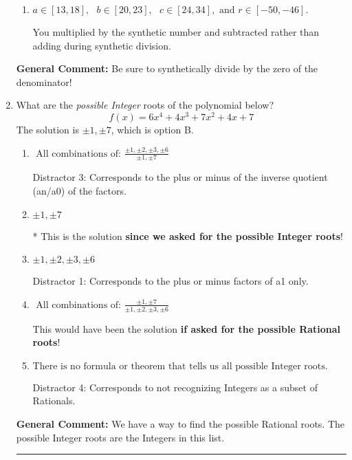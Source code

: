 \documentclass{extbook}[14pt]
\newcommand{\litem}[1]{\item #1

\rule{\textwidth}{0.4pt}}
\begin{document}
\begin{enumerate}
{\begin{enumerate}[label=\Alph*.]
 You divided by the opposite of the factor.
\item \( a \in [13, 18], \text{   } b \in [20, 23], \text{   } c \in [24, 34], \text{   and   } r \in [-50, -46]. \)

 You multiplied by the synthetic number and subtracted rather than adding during synthetic division.
\end{enumerate}

\textbf{General Comment:} Be sure to synthetically divide by the zero of the denominator!
}
\litem{
What are the \textit{possible Integer} roots of the polynomial below?
\[ f(x) = 6x^{4} +4 x^{3} +7 x^{2} +4 x + 7 \]The solution is \( \pm 1,\pm 7 \), which is option B.\begin{enumerate}[label=\Alph*.]
\item \( \text{ All combinations of: }\frac{\pm 1,\pm 2,\pm 3,\pm 6}{\pm 1,\pm 7} \)

 Distractor 3: Corresponds to the plus or minus of the inverse quotient (an/a0) of the factors. 
\item \( \pm 1,\pm 7 \)

* This is the solution \textbf{since we asked for the possible Integer roots}!
\item \( \pm 1,\pm 2,\pm 3,\pm 6 \)

 Distractor 1: Corresponds to the plus or minus factors of a1 only.
\item \( \text{ All combinations of: }\frac{\pm 1,\pm 7}{\pm 1,\pm 2,\pm 3,\pm 6} \)

This would have been the solution \textbf{if asked for the possible Rational roots}!
\item \( \text{There is no formula or theorem that tells us all possible Integer roots.} \)

 Distractor 4: Corresponds to not recognizing Integers as a subset of Rationals.
\end{enumerate}

\textbf{General Comment:} We have a way to find the possible Rational roots. The possible Integer roots are the Integers in this list.
}
\end{enumerate}
\end{document}
